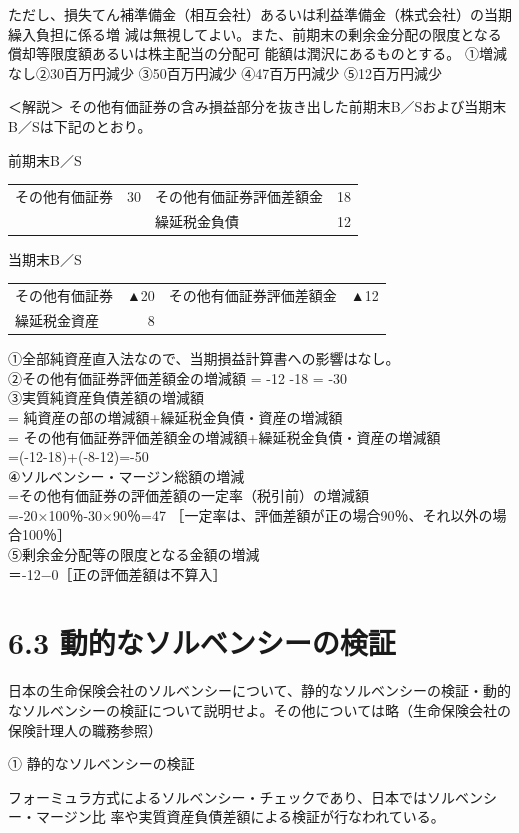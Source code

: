 \documentclass[report,gutter=10mm,fore-edge=10mm,uplatex,dvipdfmx]{jlreq}
\begin{document}
ただし、損失てん補準備金（相互会社）あるいは利益準備金（株式会社）の当期繰入負担に係る増
減は無視してよい。また、前期末の剰余金分配の限度となる償却等限度額あるいは株主配当の分配可
能額は潤沢にあるものとする。
\answer{}
①増減なし②30百万円減少
③50百万円減少
④47百万円減少
⑤12百万円減少

＜解説＞
その他有価証券の含み損益部分を抜き出した前期末B／Sおよび当期末B／Sは下記のとおり。

前期末B／S
\begin{tabular}{lrlr}
その他有価証券 & 30 & その他有価証券評価差額金&18\\
 & &繰延税金負債&12 \\
\end{tabular}

当期末B／S
\begin{tabular}{lrlr}
その他有価証券&▲20&その他有価証券評価差額金&▲12\\
繰延税金資産&8\\
\end{tabular}

①全部純資産直入法なので、当期損益計算書への影響はなし。\\
②その他有価証券評価差額金の増減額 = -12 -18 = -30\\
③実質純資産負債差額の増減額\\
=  純資産の部の増減額+繰延税金負債・資産の増減額\\
= その他有価証券評価差額金の増減額+繰延税金負債・資産の増減額\\
=(-12-18)+(-8-12)=-50\\
④ソルベンシー・マージン総額の増減\\
=その他有価証券の評価差額の一定率（税引前）の増減額\\
=-20×100％-30×90％=47 ［一定率は、評価差額が正の場合90％、それ以外の場合100％］\\
⑤剰余金分配等の限度となる金額の増減\\
＝-12−0［正の評価差額は不算入］

\section{6.3 動的なソルベンシーの検証}
日本の生命保険会社のソルベンシーについて、静的なソルベンシーの検証・動的なソルベンシーの検証について説明せよ。その他については略（生命保険会社の保険計理人の職務参照）

\answer{}
①
静的なソルベンシーの検証

フォーミュラ方式によるソルベンシー・チェックであり、日本ではソルベンシー・マージン比
率や実質資産負債差額による検証が行なわれている。
\end{document}
